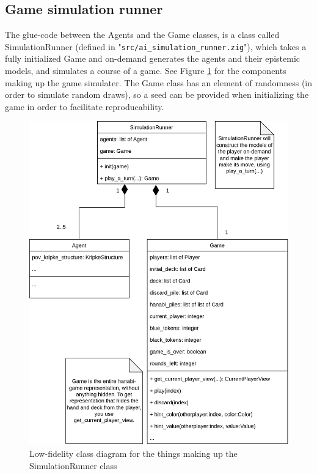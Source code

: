 \subsection{Game simulation runner}
The glue-code between the Agents and the Game classes, is a class called SimulationRunner (defined in "{\tt src/ai\_simulation\_runner.zig}"), which takes a fully initialized Game and on-demand generates the agents and their epistemic models, and simulates a course of a game. See Figure \ref{fig:SimulationRunner-class-diagram} for the components making up the game simulater. The Game class has an element of randomness (in order to simulate random draws), so a seed can be provided when initializing the game in order to facilitate reproducability.

\begin{figure}
	\includegraphics[width=13cm]{images/simulationrunner-uml-class-diagram.png}
	\caption{Low-fidelity class diagram for the things making up the SimulationRunner class}
	\label{fig:SimulationRunner-class-diagram}
\end{figure}
